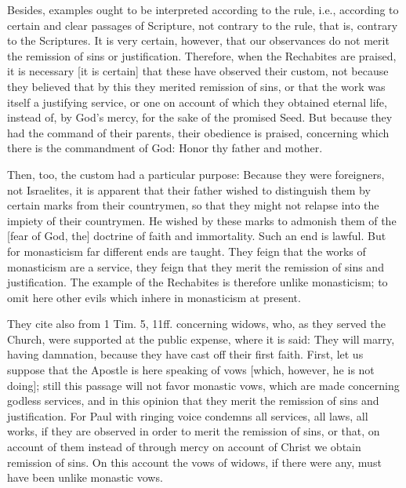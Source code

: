 Besides, examples ought to be interpreted according to the rule, i.e.,
according to certain and clear passages of Scripture, not contrary
to the rule, that is, contrary to the Scriptures.  It is very certain,
however, that our observances do not merit the remission of sins or
justification.  Therefore, when the Rechabites are praised, it is
necessary [it is certain] that these have observed their custom, not
because they believed that by this they merited remission of sins, or
that the work was itself a justifying service, or one on account of
which they obtained eternal life, instead of, by God's mercy, for the
sake of the promised Seed.  But because they had the command of their
parents, their obedience is praised, concerning which there is the
commandment of God: Honor thy father and mother.

Then, too, the custom had a particular purpose: Because they were
foreigners, not Israelites, it is apparent that their father wished
to distinguish them by certain marks from their countrymen, so that
they might not relapse into the impiety of their countrymen.  He
wished by these marks to admonish them of the [fear of God, the]
doctrine of faith and immortality.  Such an end is lawful.  But for
monasticism far different ends are taught.  They feign that the works
of monasticism are a service, they feign that they merit the
remission of sins and justification.  The example of the Rechabites
is therefore unlike monasticism; to omit here other evils which
inhere in monasticism at present.

They cite also from 1 Tim. 5, 11ff. concerning widows, who, as they
served the Church, were supported at the public expense, where it is
said: They will marry, having damnation, because they have cast off
their first faith.  First, let us suppose that the Apostle is here
speaking of vows [which, however, he is not doing]; still this
passage will not favor monastic vows, which are made concerning
godless services, and in this opinion that they merit the remission
of sins and justification.  For Paul with ringing voice condemns all
services, all laws, all works, if they are observed in order to merit
the remission of sins, or that, on account of them instead of through
mercy on account of Christ we obtain remission of sins.  On this
account the vows of widows, if there were any, must have been unlike
monastic vows.

